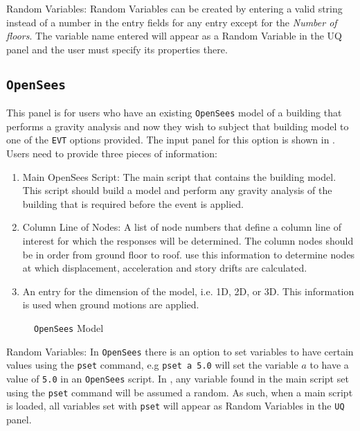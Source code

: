 Random Variables: Random Variables can be created by entering
a valid string instead of a number in the entry fields for any entry
except for the \emph{Number of floors}. The variable name entered will appear as
a Random Variable in the UQ panel and the user must specify its properties there.

\subsection{\texttt{OpenSees}}\label{sec:OpenSeesSIM}
This panel is for users who have an existing \texttt{OpenSees} model of a
building that performs a gravity analysis and now they wish to subject that
building model to one of the \texttt{EVT} options provided. The input panel
for this option is shown in . Users need to provide three pieces of information:
\begin{enumerate} 
\item Main OpenSees Script: The main script that contains the building
  model. This script should build a model and perform any gravity
  analysis of the building that is required before the event is
  applied.
\item Column Line of Nodes: A list of node numbers that define a column line of interest for which
  the responses will be determined. The column nodes should be in
  order from ground floor to roof. 
  use this information to determine nodes at which
  displacement, acceleration and story drifts are calculated.
\item An entry for the dimension of the model, i.e. 1D, 2D, or 3D. This
  information is used when ground motions are applied.
\end{enumerate}

\begin{figure}[!htbp]
  \caption{\texttt{OpenSees} Model}
  \label{fig:figure3}
\end{figure}

Random Variables: In \texttt{OpenSees} there is an option to set
variables to have certain values using the \texttt{pset} command, e.g
\texttt{pset a 5.0} will set the variable $a$ to have a value of \texttt{5.0} in an
\texttt{OpenSees} script. In \texttt{\getsoftwarename{}}, any variable
found in the main script set using the \texttt{pset} command
will be assumed a random. As such, when a main
script is loaded, all variables set with \texttt{pset} will appear as
Random Variables in the \texttt{UQ} panel.
